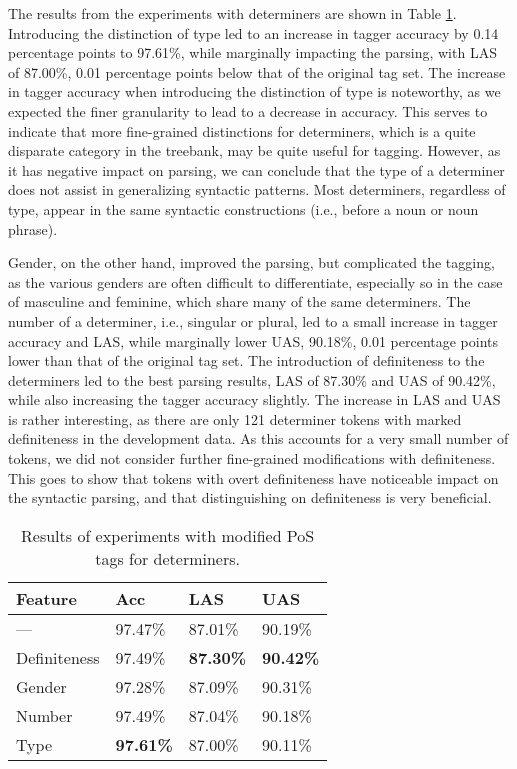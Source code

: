 \documentclass[11pt,a4paper]{article}
\begin{document}
The results from the experiments with determiners are shown in Table
\ref{detresults}.  Introducing the distinction of type led to an increase in
tagger accuracy by 0.14 percentage points to 97.61\%, while marginally
impacting the parsing, with LAS of 87.00\%, 0.01 percentage points below that
of the original tag set.  The increase in tagger accuracy when introducing the
distinction of type is noteworthy, as we expected the finer granularity to lead
to a decrease in accuracy. This serves to indicate that more fine-grained
distinctions for determiners, which is a quite disparate category in the
treebank, may be quite useful for tagging. However, as it has negative impact
on parsing, we can conclude that the type of a determiner does not assist in
generalizing syntactic patterns. Most determiners, regardless of type, appear
in the same syntactic constructions (i.e., before a noun or noun phrase).

Gender, on the other hand, improved the parsing, but complicated the tagging,
as the various genders are often difficult to differentiate, especially so in
the case of masculine and feminine, which share many of the same determiners.
The number of a determiner, i.e., singular or plural, led to a small increase
in tagger accuracy and LAS, while marginally lower UAS, 90.18\%, 0.01
percentage points lower than that of the original tag set. The
introduction of definiteness to the determiners led to the best parsing
results, LAS of 87.30\% and UAS of 90.42\%, while also increasing the tagger
accuracy slightly. The increase in LAS and UAS is rather interesting, as there
are only 121 determiner tokens with marked definiteness in the development
data. As this accounts for a very small number of tokens, we did not consider
further fine-grained modifications with definiteness. This goes to show that
tokens with overt definiteness have noticeable impact on the syntactic parsing,
and that distinguishing on definiteness is very beneficial.

\begin{table}
    \centering
    \smaller[0.5]
    \begin{tabular}{@{}llll@{}}
        \toprule
        \textbf{Feature} & \textbf{Acc} & \textbf{LAS} & \textbf{UAS} \\
        \midrule
        --- & 97.47\% & 87.01\% & 90.19\% \\
        Definiteness & 97.49\% & \textbf{87.30\%} & \textbf{90.42\%} \\
        Gender & 97.28\% & 87.09\% & 90.31\% \\
        Number & 97.49\% & 87.04\% & 90.18\% \\
        Type & \textbf{97.61\%} & 87.00\% & 90.11\% \\
        \bottomrule
    \end{tabular}
    \caption{Results of experiments with modified PoS tags for determiners.}
    \label{detresults}
\end{table}
\end{document}
